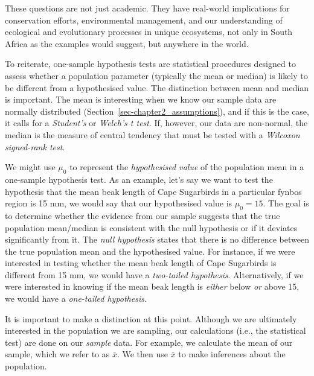 \documentclass[
  letterpaper,
]{book}
\begin{document}
\vspace{6pt}

These questions are not just academic. They have real-world implications
for conservation efforts, environmental management, and our
understanding of ecological and evolutionary processes in unique
ecosystems, not only in South Africa as the examples would suggest, but
anywhere in the world.

To reiterate, one-sample hypothesis tests are statistical procedures
designed to assess whether a population parameter (typically the mean or
median) is likely to be different from a hypothesised value. The
distinction between mean and median is important. The mean is
interesting when we know our sample data are normally distributed
(Section~\ref{sec-chapter2_assumptions}), and if this is the case, it
calls for a \emph{Student's} or \emph{Welch's \emph{t} test}.
If, however, our data are non-normal, the median is the measure of
central tendency that must be tested with a
\emph{Wilcoxon signed-rank test}.

We might use \(\mu_0\) to represent the \emph{hypothesised value} of the
population mean in a one-sample hypothesis test. As an example, let's
say we want to test the hypothesis that the mean beak length of Cape
Sugarbirds in a particular fynbos region is 15 mm, we would say that our
hypothesised value is \(\mu_0=15\). The goal is to determine whether the
evidence from our sample suggests that the true population mean/median
is consistent with the null hypothesis or if it deviates significantly
from it. The \emph{null hypothesis} states that there is no difference
between the true population mean and the hypothesised value.
 For instance, if we were
interested in testing whether the mean beak length of Cape Sugarbirds is
different from 15 mm, we would have a \emph{two-tailed hypothesis}.
Alternatively, if we were interested in knowing if the mean beak length
is \emph{either} below \emph{or} above 15, we would have a
\emph{one-tailed hypothesis}.

It is important to make a distinction at this point. Although we are
ultimately interested in the population we are sampling, our
calculations (i.e., the statistical test) are done on our \emph{sample}
data. For example, we calculate the mean of our sample, which we refer
to as \(\bar{x}\). We then use \(\bar{x}\) to make inferences about the
population.
\end{document}
